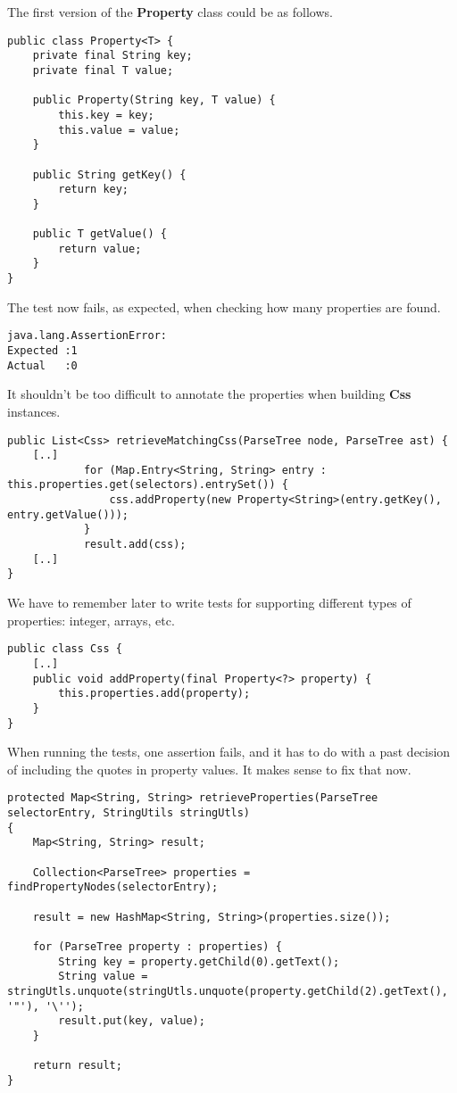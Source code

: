 \documentclass[11pt]{article}
\begin{document}
The first version of the \textbf{Property} class could be as follows.

\begin{verbatim}
public class Property<T> {
    private final String key;
    private final T value;

    public Property(String key, T value) {
        this.key = key;
        this.value = value;
    }

    public String getKey() {
        return key;
    }

    public T getValue() {
        return value;
    }
}
\end{verbatim}

The test now fails, as expected, when checking how many properties are found.

\begin{verbatim}
java.lang.AssertionError: 
Expected :1
Actual   :0
\end{verbatim}

It shouldn't be too difficult to annotate the properties when building \textbf{Css} instances.

\begin{verbatim}
public List<Css> retrieveMatchingCss(ParseTree node, ParseTree ast) {
    [..]
            for (Map.Entry<String, String> entry : this.properties.get(selectors).entrySet()) {
                css.addProperty(new Property<String>(entry.getKey(), entry.getValue()));
            }
            result.add(css);
    [..]
}
\end{verbatim}

We have to remember later to write tests for supporting different types of properties: integer, arrays, etc.

\begin{verbatim}
public class Css {
    [..]
    public void addProperty(final Property<?> property) {
        this.properties.add(property);
    }
}
\end{verbatim}

When running the tests, one assertion fails, and it has to do with a past decision of including the quotes
in property values. It makes sense to fix that now.

\begin{verbatim}
protected Map<String, String> retrieveProperties(ParseTree selectorEntry, StringUtils stringUtls)
{
    Map<String, String> result;

    Collection<ParseTree> properties = findPropertyNodes(selectorEntry);

    result = new HashMap<String, String>(properties.size());

    for (ParseTree property : properties) {
        String key = property.getChild(0).getText();
        String value = stringUtls.unquote(stringUtls.unquote(property.getChild(2).getText(), '"'), '\'');
        result.put(key, value);
    }

    return result;
}
\end{verbatim}
\end{document}
